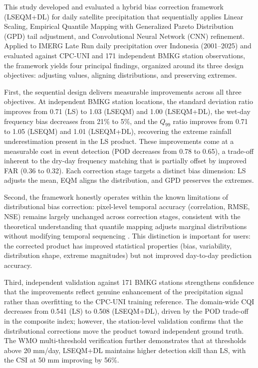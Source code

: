 \documentclass[remotesensing,article,submit,pdftex,moreauthors]{Definitions/mdpi}
\begin{document}
This study developed and evaluated a hybrid bias correction framework
(LSEQM+DL) for daily satellite precipitation that sequentially applies
Linear Scaling, Empirical Quantile Mapping with Generalized Pareto
Distribution (GPD) tail adjustment, and Convolutional Neural Network
(CNN) refinement. Applied to IMERG Late Run daily precipitation over
Indonesia (2001--2025) and evaluated against CPC-UNI and 171 independent
BMKG station observations, the framework yields four principal findings,
organized around its three design objectives: adjusting values, aligning
distributions, and preserving extremes.

First, the sequential design delivers measurable improvements across all
three objectives. At independent BMKG station locations, the standard
deviation ratio improves from 0.71 (LS) to 1.03 (LSEQM) and 1.00
(LSEQM+DL), the wet-day frequency bias decreases from 21\% to 5\%, and
the \(Q_{99}\) ratio improves from 0.71 to 1.05 (LSEQM) and 1.01
(LSEQM+DL), recovering the extreme rainfall underestimation present in
the LS product. These improvements come at a measurable cost in event
detection (POD decreases from 0.78 to 0.65), a trade-off inherent to the
dry-day frequency matching \cite{ref11} that is partially offset by improved
FAR (0.36 to 0.32). Each correction stage targets a distinct bias
dimension: LS adjusts the mean, EQM aligns the distribution, and GPD
preserves the extremes.

Second, the framework honestly operates within the known limitations of
distributional bias correction: pixel-level temporal accuracy
(correlation, RMSE, NSE) remains largely unchanged across correction
stages, consistent with the theoretical understanding that quantile
mapping adjusts marginal distributions without modifying temporal
sequencing \cite{ref34}. This distinction is important for users: the
corrected product has improved statistical properties (bias,
variability, distribution shape, extreme magnitudes) but not improved
day-to-day prediction accuracy.

Third, independent validation against 171 BMKG stations strengthens
confidence that the improvements reflect genuine enhancement of the
precipitation signal rather than overfitting to the CPC-UNI training
reference. The domain-wide CQI decreases from 0.541 (LS) to 0.508
(LSEQM+DL), driven by the POD trade-off in the composite index; however,
the station-level validation confirms that the distributional
corrections move the product toward independent ground truth. The WMO
multi-threshold verification further demonstrates that at thresholds
above 20 mm/day, LSEQM+DL maintains higher detection skill than LS, with
the CSI at 50 mm improving by 56\%.
\end{document}
